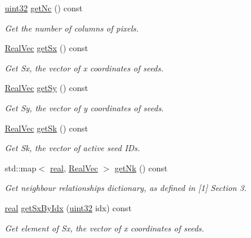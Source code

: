 \begin{DoxyCompactItemize}
\mbox{\hyperlink{typedefs_8h_a8ad23e2333787a214e20a58a284a5a60}{uint32}} \mbox{\hyperlink{classvd_a555fdcee74959a18003dd992a4c57cef}{get\+Nc}} () const
\begin{DoxyCompactList}\small\item\em Get the number of columns of pixels. \end{DoxyCompactList}\item 
\mbox{\hyperlink{typedefs_8h_a84b6d9a0fbb45e01ad4a3aa5667f2992}{Real\+Vec}} \mbox{\hyperlink{classvd_a309203fb398a885176ae985a8906e886}{get\+Sx}} () const
\begin{DoxyCompactList}\small\item\em Get Sx, the vector of x coordinates of seeds. \end{DoxyCompactList}\item 
\mbox{\hyperlink{typedefs_8h_a84b6d9a0fbb45e01ad4a3aa5667f2992}{Real\+Vec}} \mbox{\hyperlink{classvd_a704c56db9a9782e1c82d3d199ddfd699}{get\+Sy}} () const
\begin{DoxyCompactList}\small\item\em Get Sy, the vector of y coordinates of seeds. \end{DoxyCompactList}\item 
\mbox{\hyperlink{typedefs_8h_a84b6d9a0fbb45e01ad4a3aa5667f2992}{Real\+Vec}} \mbox{\hyperlink{classvd_adf9f15df018d2ceff5f68bdf7bd6f613}{get\+Sk}} () const
\begin{DoxyCompactList}\small\item\em Get Sk, the vector of active seed I\+Ds. \end{DoxyCompactList}\item 
std\+::map$<$ \mbox{\hyperlink{typedefs_8h_a58a0c7cf2501f4492da833421be92547}{real}}, \mbox{\hyperlink{typedefs_8h_a84b6d9a0fbb45e01ad4a3aa5667f2992}{Real\+Vec}} $>$ \mbox{\hyperlink{classvd_a90613fc46f246a5450e26487caff33f9}{get\+Nk}} () const
\begin{DoxyCompactList}\small\item\em Get neighbour relationships dictionary, as defined in \mbox{[}1\mbox{]} Section 3. \end{DoxyCompactList}\item 
\mbox{\hyperlink{typedefs_8h_a58a0c7cf2501f4492da833421be92547}{real}} \mbox{\hyperlink{classvd_a960d4b8fbedb7cbb0686ad42e19d6396}{get\+Sx\+By\+Idx}} (\mbox{\hyperlink{typedefs_8h_a8ad23e2333787a214e20a58a284a5a60}{uint32}} idx) const
\begin{DoxyCompactList}\small\item\em Get element of Sx, the vector of x coordinates of seeds. \end{DoxyCompactList}\item 

\end{DoxyCompactItemize}
